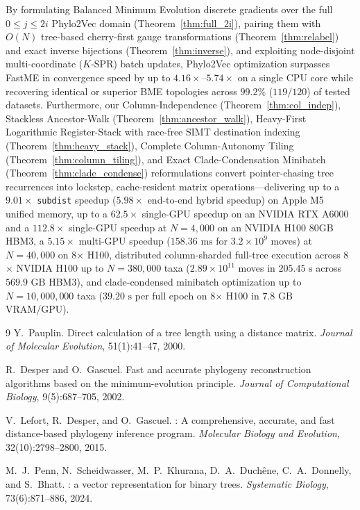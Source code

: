 \documentclass[11pt,a4paper]{article}
\theoremstyle{definition}
\begin{document}
By formulating Balanced Minimum Evolution discrete gradients over the full $0 \le j \le 2i$ Phylo2Vec domain (Theorem~\ref{thm:full_2i}), pairing them with $O(N)$ tree-based cherry-first gauge transformations (Theorem~\ref{thm:relabel}) and exact inverse bijections (Theorem~\ref{thm:inverse}), and exploiting node-disjoint multi-coordinate ($K$-SPR) batch updates, Phylo2Vec optimization surpasses FastME in convergence speed by up to $4.16\times\text{--}5.74\times$ on a single CPU core while recovering identical or superior BME topologies across $99.2\%$ ($119/120$) of tested datasets. Furthermore, our Column-Independence (Theorem~\ref{thm:col_indep}), Stackless Ancestor-Walk (Theorem~\ref{thm:ancestor_walk}), Heavy-First Logarithmic Register-Stack with race-free SIMT destination indexing (Theorem~\ref{thm:heavy_stack}), Complete Column-Autonomy Tiling (Theorem~\ref{thm:column_tiling}), and Exact Clade-Condensation Minibatch (Theorem~\ref{thm:clade_condense}) reformulations convert pointer-chasing tree recurrences into lockstep, cache-resident matrix operations—delivering up to a $9.01\times$ \texttt{subdist} speedup ($5.98\times$ end-to-end hybrid speedup) on Apple M5 unified memory, up to a $62.5\times$ single-GPU speedup on an NVIDIA RTX A6000 and a $112.8\times$ single-GPU speedup at $N = 4{,}000$ on an NVIDIA H100 80GB HBM3, a $5.15\times$ multi-GPU speedup ($158.36\text{ ms}$ for $3.2 \times 10^9$ moves) at $N = 40{,}000$ on 8$\times$ H100, distributed column-sharded full-tree execution across 8$\times$ NVIDIA H100 up to $N = 380{,}000$ taxa ($2.89 \times 10^{11}$ moves in $205.45\text{ s}$ across $569.9\text{ GB}$ HBM3), and clade-condensed minibatch optimization up to $N = 10{,}000{,}000$ taxa ($39.20\text{ s}$ per full epoch on 8$\times$ H100 in $7.8\text{ GB}$ VRAM/GPU).

\begin{thebibliography}{9}
Y.~Pauplin.
\newblock Direct calculation of a tree length using a distance matrix.
\newblock \emph{Journal of Molecular Evolution}, 51(1):41--47, 2000.

R.~Desper and O.~Gascuel.
\newblock Fast and accurate phylogeny reconstruction algorithms based on the minimum-evolution principle.
\newblock \emph{Journal of Computational Biology}, 9(5):687--705, 2002.

V.~Lefort, R.~Desper, and O.~Gascuel.
: A comprehensive, accurate, and fast distance-based phylogeny inference program.
\newblock \emph{Molecular Biology and Evolution}, 32(10):2798--2800, 2015.

M.~J.~Penn, N.~Scheidwasser, M.~P.~Khurana, D.~A.~Duch\^ene, C.~A.~Donnelly, and S.~Bhatt.
: a vector representation for binary trees.
\newblock \emph{Systematic Biology}, 73(6):871--886, 2024.
\end{thebibliography}
\end{document}

